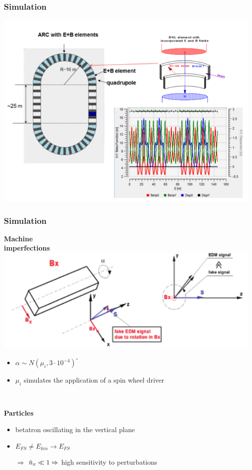 \documentclass[14pt]{beamer}
\begin{document}
\begin{frame}\frametitle{Simulation}\centering
	\includegraphics[width=.8\linewidth]{chapter2/BNL_lattice}
\end{frame}
\begin{frame}\frametitle{Simulation}
	\begin{minipage}[t]{.48\linewidth}
	\textbf{Machine\\ imperfections}
	\includegraphics[width=1.2\linewidth, trim=80 10 0 0, clip]{images/magnet_tilting}
	\begin{itemize}
		\item $\alpha\sim N(\mu_i, 3\cdot10^{-4})^\circ$
		\item $\mu_i$ simulates the application of a spin wheel driver
	\end{itemize}
	\end{minipage}~~~~
	\begin{minipage}[t]{.45\linewidth}
	\textbf{Particles}
	\begin{itemize}
		\item betatron oscillating in the vertical plane
		\item $E_{FS}\neq E_{kin}\to E_{FS}$
		\item[$\Rightarrow$] $\bar n_x\ll 1 \Rightarrow$ high sensitivity to perturbations
	\end{itemize}
	\end{minipage}
\end{frame}
\end{document}
